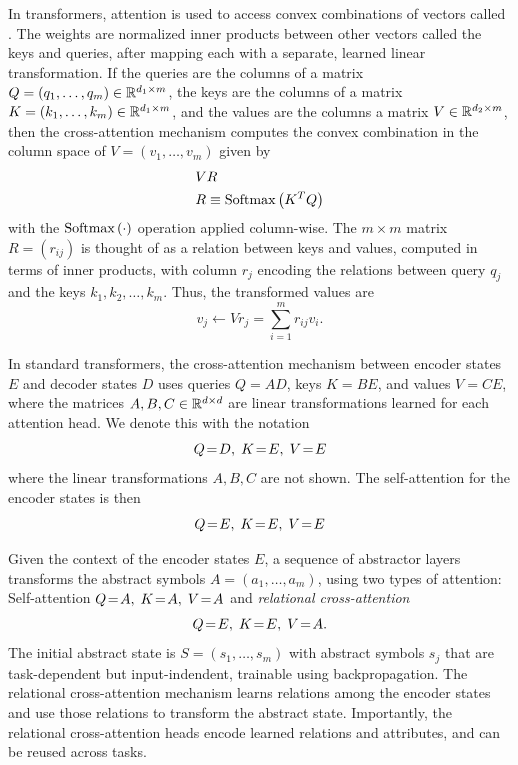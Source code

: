 In transformers, attention is used to access convex combinations of vectors called . The weights are normalized inner products between other vectors called the keys and queries, after mapping each with a separate, learned linear transformation. If the queries are the columns of a matrix $Q = (q_1,\ldots, q_m)\in\mathbb{R}^{d_1\times m}$, the keys are the columns of a matrix $K = (k_1, \ldots, k_m)\in\mathbb{R}^{d_1\times m}$, and the values are the columns a matrix $V\in\mathbb{R}^{d_2\times m}$, then the cross-attention mechanism computes the convex combination in the column space of $V = (v_1, \ldots, v_m)$ given by 
\begin{align*}
    & V R  \\
    & R \equiv \softmax{K^T Q}
\end{align*}
with  the $\mbox{Softmax}\left(\cdot\right)$ operation applied column-wise. The $m\times m$ matrix $R = (r_{ij})$ is thought of 
as a relation between keys and values, computed in terms of inner products, with column $r_j$ 
encoding the relations between query $q_j$ and the keys $k_1, k_2, \ldots, k_m$. Thus, the transformed 
values are 
\begin{equation*}
    v_j \leftarrow V r_j = \sum_{i=1}^m r_{ij} v_i .
\end{equation*}

In standard transformers, the cross-attention mechanism between encoder states $E$ and decoder states $D$
uses queries $Q = AD$, keys $K = BE$, and values $V = CE$, where the matrices $A,B,C \in\mathbb{R}^{d\times d}$ are 
linear transformations learned for each attention head.  We denote this with the notation 
\begin{equation*}
     \qkv{D}{E}{E}
\end{equation*}
where the linear transformations $A, B, C$ are not shown. The self-attention for the encoder 
states is then
\begin{equation*}
    \qkv{E}{E}{E}
\end{equation*}

Given the context of the encoder states $E$, a sequence of abstractor layers transforms the abstract symbols $A = (a_1,\ldots, a_m)$, using two types of attention: Self-attention $Q\!=\!A,\; K\!=\!A,\; V\!=\!A$ and 
\textit{relational cross-attention} 
\begin{equation*}
    \qkv{E}{E}{A}.
\end{equation*} 
The initial abstract state is $S = (s_1,\ldots, s_m)$ 
with abstract symbols $s_j$ that are task-dependent but input-indendent, trainable using 
backpropagation. The relational cross-attention mechanism learns relations among the encoder states and use those relations to transform the abstract state. Importantly, the relational cross-attention heads 
encode learned relations and attributes, and can be reused across tasks.


